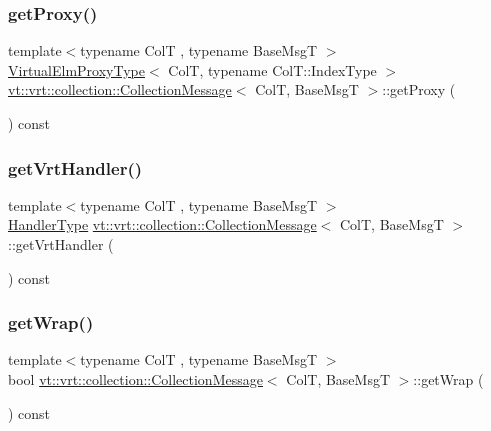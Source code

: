 \subsubsection{\texorpdfstring{get\+Proxy()}{getProxy()}}
{\footnotesize\ttfamily template$<$typename ColT , typename Base\+MsgT $>$ \\
\hyperlink{namespacevt_1_1vrt_a620a5c8c59d13e513f690c74b4af516f}{Virtual\+Elm\+Proxy\+Type}$<$ ColT, typename Col\+T\+::\+Index\+Type $>$ \hyperlink{structvt_1_1vrt_1_1collection_1_1_collection_message}{vt\+::vrt\+::collection\+::\+Collection\+Message}$<$ ColT, Base\+MsgT $>$\+::get\+Proxy (\begin{DoxyParamCaption}{ }\end{DoxyParamCaption}) const}

\mbox{\label{structvt_1_1vrt_1_1collection_1_1_collection_message_aa5966355f4fe5f9ac7dc965a7f6e4de4}} 
\subsubsection{\texorpdfstring{get\+Vrt\+Handler()}{getVrtHandler()}}
{\footnotesize\ttfamily template$<$typename ColT , typename Base\+MsgT $>$ \\
\hyperlink{namespacevt_af64846b57dfcaf104da3ef6967917573}{Handler\+Type} \hyperlink{structvt_1_1vrt_1_1collection_1_1_collection_message}{vt\+::vrt\+::collection\+::\+Collection\+Message}$<$ ColT, Base\+MsgT $>$\+::get\+Vrt\+Handler (\begin{DoxyParamCaption}{ }\end{DoxyParamCaption}) const}

\mbox{\label{structvt_1_1vrt_1_1collection_1_1_collection_message_adb0f0904b4bd0646e51dc0a76c54d487}} 
\subsubsection{\texorpdfstring{get\+Wrap()}{getWrap()}}
{\footnotesize\ttfamily template$<$typename ColT , typename Base\+MsgT $>$ \\
bool \hyperlink{structvt_1_1vrt_1_1collection_1_1_collection_message}{vt\+::vrt\+::collection\+::\+Collection\+Message}$<$ ColT, Base\+MsgT $>$\+::get\+Wrap (\begin{DoxyParamCaption}{ }\end{DoxyParamCaption}) const}

